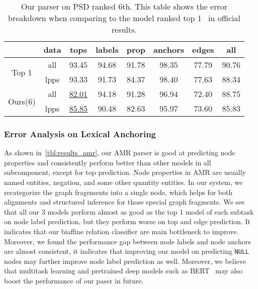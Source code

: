 \begin{table}[!tbp]
\caption{\label{tbl:results_psd} Our parser on PSD ranked 6th. This table shows the error breakdown when comparing to the model ranked top 1~\cite{Don:Fow:Gro:19} in official results.}
\begin{center}
\setlength{\tabcolsep}{3pt}
\begin{tabular}{cccccccc}
\toprule
                          & data & tops              & labels & prop  & anchors & edges & all   \\ \hline
\multirow{2}{*}{Top 1}   & all  & 93.45             & 94.68  & 91.78 & 98.35   & 77.79 & 90.76 \\
                          & lpps & 93.33             & 91.73  & 84.37 & 98.40   & 77.63 & 88.34 \\
\multirow{2}{*}{ Ours(6)} & all  & \underline{82.01} & 94.18  & 91.28 & 96.94   & 72.40 & 88.75 \\
                          & lpps & \underline{85.85} & 90.48  & 82.63 & 95.97   & 73.60 & 85.83 \\ \bottomrule
\end{tabular}
\end{center}
\end{table}

\subsubsection{Error Analysis on Lexical Anchoring}
\label{sssec:lex-phr:error-lex}
As shown in~\autoref{tbl:results_amr}, our AMR parser is good at
predicting node properties and consistently perform better than other
models in all subcomponent, except for top prediction. Node properties
in AMR are usually named entities, negation, and some other quantity
entities. In our system, we recategorize the graph fragements into a
single node, which helps for both alignments and structured inference
for those special graph fragments. We see that all our 3 models
perform almost as good as the top 1 model of each subtask on node
label prediction, but they perform worse on top and edge
prediction. It indicates that our biaffine relation classifier are
main bottleneck to improve. Moreover, we found the performance gap
between node labels and node anchors are almost consistent, it
indicates that improving our model on predicting \texttt{NULL} nodes may
further improve node label prediction as well.  Moreover, we believe
that multitask learning and pretrained deep models such as
BERT~\citep{devlin2018bert} may also boost the performance of our paser
in future.

